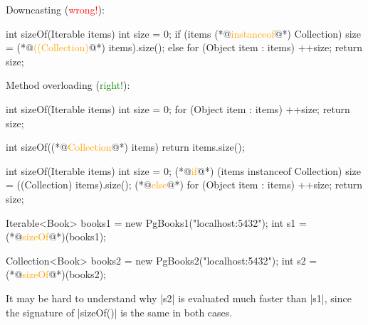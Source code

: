 \documentclass{article}
\begin{document}

\pptToc


\begin{pptWide}{2}
Downcasting (\textcolor{red}{wrong!}):\par
{\small\begin{ffcode}
int sizeOf(Iterable items) {
  int size = 0;
  if (items (*@\textcolor{orange}{instanceof}@*) Collection) {
    size = (*@\textcolor{orange}{((Collection)}@*) items).size();
  } else {
    for (Object item : items) {
      ++size;
    }
  }
  return size;
}
\end{ffcode}
}
\par\columnbreak\par
Method overloading (\textcolor{green}{right!}):\par
{\small\begin{ffcode}
int sizeOf(Iterable items) {
  int size = 0;
  for (Object item : items) {
    ++size;
  }
  return size;
}

int sizeOf((*@\textcolor{orange}{Collection}@*) items) {
  return items.size();
}
\end{ffcode}
}
\end{pptWide}
\par
\plush{}

\begin{pptWide}{2}
{\small\begin{ffcode}
int sizeOf(Iterable items) {
  int size = 0;
  (*@\textcolor{orange}{if}@*) (items instanceof Collection) {
    size = ((Collection) items).size();
  } (*@\textcolor{orange}{else}@*) {
    for (Object item : items) {
      ++size;
    }
  }
  return size;
}
\end{ffcode}
}
\par\columnbreak\par
{\small\begin{ffcode}
Iterable<Book> books1 =
  new PgBooks1("localhost:5432");
int s1 = (*@\textcolor{orange}{sizeOf}@*)(books1);

Collection<Book> books2 =
  new PgBooks2("localhost:5432");
int s2 = (*@\textcolor{orange}{sizeOf}@*)(books2);
\end{ffcode}
}
\end{pptWide}
\par
It may be hard to understand why |s2| is evaluated much faster than |s1|, since the signature of |sizeOf()| is the same in both cases.
\plush{}
\end{document}

